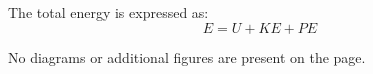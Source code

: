 The total energy is expressed as:  
\[
E = U + KE + PE
\]  

No diagrams or additional figures are present on the page.